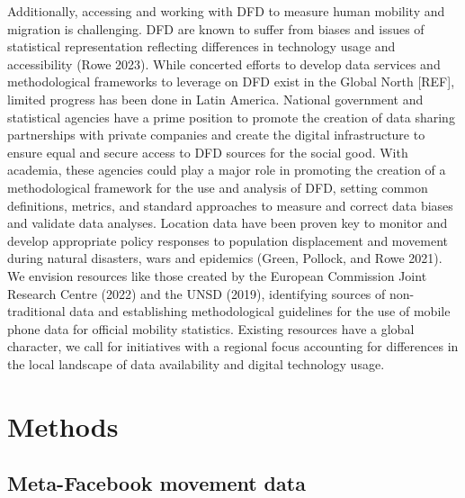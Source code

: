 \documentclass[
  11pt,
]{article}
\begin{document}
Additionally, accessing and working with DFD to measure human mobility
and migration is challenging. DFD are known to suffer from biases and
issues of statistical representation reflecting differences in
technology usage and accessibility (Rowe 2023). While concerted efforts
to develop data services and methodological frameworks to leverage on
DFD exist in the Global North {[}REF{]}, limited progress has been done
in Latin America. National government and statistical agencies have a
prime position to promote the creation of data sharing partnerships with
private companies and create the digital infrastructure to ensure equal
and secure access to DFD sources for the social good. With academia,
these agencies could play a major role in promoting the creation of a
methodological framework for the use and analysis of DFD, setting common
definitions, metrics, and standard approaches to measure and correct
data biases and validate data analyses. Location data have been proven
key to monitor and develop appropriate policy responses to population
displacement and movement during natural disasters, wars and epidemics
(Green, Pollock, and Rowe 2021). We envision resources like those
created by the European Commission Joint Research Centre (2022) and the
UNSD (2019), identifying sources of non-traditional data and
establishing methodological guidelines for the use of mobile phone data
for official mobility statistics. Existing resources have a global
character, we call for initiatives with a regional focus accounting for
differences in the local landscape of data availability and digital
technology usage.

\hypertarget{sec-methods}{%
\section{Methods}\label{sec-methods}}

\hypertarget{meta-facebook-movement-data}{%
\subsection{Meta-Facebook movement
data}\label{meta-facebook-movement-data}}
\end{document}
